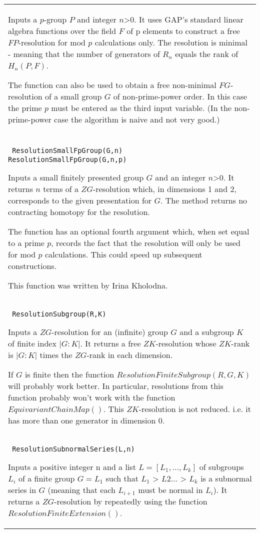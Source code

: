 \documentclass[a4paper,11pt]{report}
\begin{document}
{\begin{center}
\begin{tabular}{|l|}
 Inputs a $p$-group $P$ and integer $n${\textgreater}$0$. It uses GAP's standard linear algebra functions over the field $F$ of p elements to construct a free $FP$-resolution for mod $p$ calculations only. The resolution is minimal - meaning that the number of
generators of $R_n$ equals the rank of $H_n(P,F)$. 

 The function can also be used to obtain a free non-minimal $FG$-resolution of a small group $G$ of non-prime-power order. In this case the prime $p$ must be entered as the third input variable. (In the non-prime-power case the
algorithm is naive and not very good.) \\
 \index{ResolutionSmallFpGroup} \texttt{ ResolutionSmallFpGroup(G,n) } {\nobreakspace} \texttt{ ResolutionSmallFpGroup(G,n,p) } 

 Inputs a small finitely presented group $G$ and an integer $n${\textgreater}$0$. It returns $n$ terms of a $ZG$-resolution which, in dimensions 1 and 2, corresponds to the given
presentation for $G$. The method returns no contracting homotopy for the resolution.

 The function has an optional fourth argument which, when set equal to a prime $p$, records the fact that the resolution will only be used for mod $p$ calculations. This could speed up subsequent constructions. 

 This function was written by Irina Kholodna. \\
 \index{ResolutionSubgroup} \texttt{ ResolutionSubgroup(R,K)} 

 Inputs a $ZG$-resolution for an (infinite) group $G$ and a subgroup $K$ of finite index $|G:K|$. It returns a free $ZK$-resolution whose $ZK$-rank is $|G:K|$ times the $ZG$-rank in each dimension.

 If $G$ is finite then the function $ResolutionFiniteSubgroup(R,G,K)$ will probably work better. In particular, resolutions from this function
probably won't work with the function $EquivariantChainMap()$. This $ZK$-resolution is not reduced. i.e. it has more than one generator in dimension
0. \\
 \index{ResolutionSubnormalSeries} \texttt{ ResolutionSubnormalSeries(L,n) } 

 Inputs a positive integer n and a list $L = [L_1 , \ldots , L_k]$ of subgroups $L_i$ of a finite group $G=L_1$ such that $L_1$ {\textgreater} $L2 \ldots $ {\textgreater} $L_k$ is a subnormal series in $G$ (meaning that each $L_{i+1}$ must be normal in $L_i$). It returns a $ZG$-resolution by repeatedly using the function $ResolutionFiniteExtension()$.


\end{tabular}
\end{center}}
\end{document}
